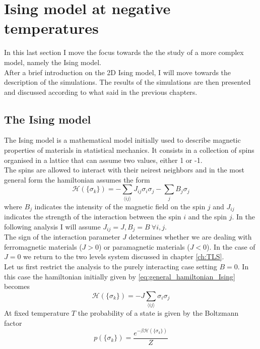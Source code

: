 \chapter{Ising model at negative temperatures}
\label{ch:ising}
In this last section I move the focus towards the the study of a more complex model, namely the Ising model. \\
After a brief introduction on the 2D Ising model, I will move towards the description of the simulations. The results of the
simulations are then presented and discussed according to what said in the previous chapters. \\

\section{The Ising model}
The Ising model is a mathematical model initially used to describe magnetic properties of materials in statistical mechanics. It consists in a collection of spins 
organised in a lattice that can assume two values, either 1 or -1. \\
The spins are allowed to interact with their neirest neighbors and in the most general form the hamiltonian assumes the form
\begin{equation}
    \mathcal{H}(\{\sigma_k\}) = -\sum_{\langle i j\rangle} J_{i j} \sigma_{i} \sigma_{j} - \sum_{j} B_j\sigma_{j}
    \label{eq:general_hamiltonian_Ising}
\end{equation}
where $B_j$ indicates the intensity of the magnetic field on the spin $j$ and $J_{ij}$ indicates the strength of the interaction between the spin $i$ and the spin $j$.
In the following analysis I will assume $J_{ij} = J, B_j = B \ \forall i,j$. \\
The sign of the interaction parameter $J$ determines whether we are dealing with ferromagnetic materials ($J>0$) or paramagnetic materials ($J < 0$). In the case of $J=0$
we return to the two levels system discussed in chapter \ref{ch:TLS}. \\
Let us first restrict the analysis to the purely interacting case setting $B=0$. In this case the hamiltonian initially given by \ref{eq:general_hamiltonian_Ising} becomes
\begin{equation*}
    \mathcal{H}(\{\sigma_k\}) = -J \sum_{\langle i j\rangle}\sigma_{i} \sigma_{j}
\end{equation*}
At fixed temperature $T$ the probability of a state is given by the Boltzmann factor
\begin{equation}
    p(\{\sigma_k\}) = \frac{e^{-\beta\mathcal{H}(\{\sigma_k\})}}{Z}
    \label{eq:Boltzmann_factor_Ising}
\end{equation}
